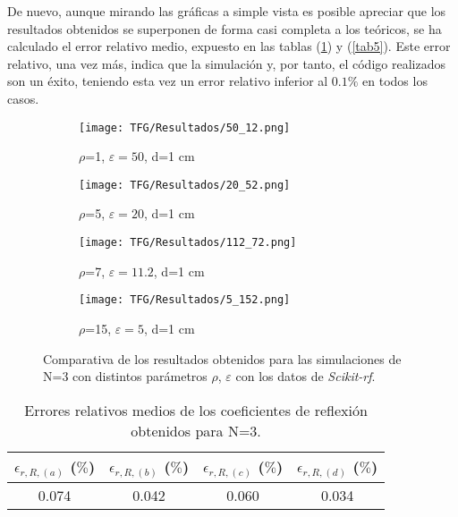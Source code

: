 \documentclass[11pt,a4paper,twoside,pdf]{article}
\numberwithin{equation}{section}
\begin{document}
De nuevo, aunque mirando las gráficas a simple vista es posible apreciar que los resultados obtenidos se superponen de forma casi completa a los teóricos, se ha calculado el error relativo medio, expuesto en las tablas (\ref{tab4}) y (\ref{tab5}). Este error relativo, una vez más, indica que la simulación y, por tanto, el código realizados son un éxito, teniendo esta vez un error relativo inferior al $0.1\%$ en todos los casos.
\newpage
\begin{figure}[H]
    \centering
        \begin{subfigure}[b]{0.475\textwidth}
        \centering
        \texttt{[image: TFG/Resultados/50\_12.png]}
        \caption{$\rho$=1, $\varepsilon=50$, d=1 cm}
        \label{f:gato}
    \end{subfigure}
    \hfill
    \begin{subfigure}[b]{0.475\textwidth}
        \centering
        \texttt{[image: TFG/Resultados/20\_52.png]}
        \caption{$\rho$=5, $\varepsilon=20$, d=1 cm}
        \label{f:tigre}
    \end{subfigure}

        \begin{subfigure}[b]{0.475\textwidth}
        \centering
        \texttt{[image: TFG/Resultados/112\_72.png]}
        \caption{$\rho$=7, $\varepsilon=11.2$, d=1 cm}
        \label{f:gato}
    \end{subfigure}
    \hfill
    \begin{subfigure}[b]{0.475\textwidth}
        \centering
        \texttt{[image: TFG/Resultados/5\_152.png]}
        \caption{$\rho$=15, $\varepsilon=5$, d=1 cm}
        \label{f:tigre}
    \end{subfigure}
    \caption{Comparativa de los resultados obtenidos para las simulaciones de N=3 con distintos parámetros $\rho$, $\varepsilon$ con los datos de \textit{Scikit-rf}.}
    \label{fig11}
\end{figure}
\begin{table}[H]
\centering
\begin{tabular}{|c|c|c|c|}
\hline
\textbf{$\epsilon_{r,R,(a)}$ ($\%$)} & \textbf{$\epsilon_{r,R,(b)}$ ($\%$)} & \textbf{$\epsilon_{r,R,(c)}$ ($\%$)} & \textbf{$\epsilon_{r,R,(d)}$ ($\%$)} \\ \hline
0.074                                 & 0.042                                & 0.060                                 & 0.034                                \\ \hline
\end{tabular}
\caption{Errores relativos medios de los coeficientes de reflexión obtenidos para N=3.}
\label{tab4}
\end{table}
\end{document}
